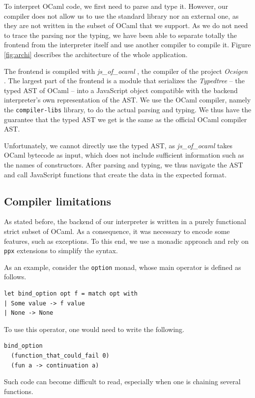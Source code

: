 \documentclass[twocolumn,a4paper]{article}
\begin{document}
To interpret OCaml code, we first need to parse and type it. However, our
compiler does not allow us to use the standard library nor an external one, as
they are not written in the subset of OCaml that we support. As we do not need
to trace the parsing nor the typing, we have been able to separate totally the
frontend from the interpreter itself and use another compiler to compile it.
Figure \ref{fig:archi} describes the architecture of the whole application.

The frontend is compiled with \emph{js\_of\_ocaml}
\cite{DBLP:journals/spe/VouillonB14}, the compiler of the project \emph{Ocsigen}
\cite{balat:hal-00691710}. The largest part of the frontend is a module that
serializes the \emph{Typedtree} -- the typed AST of OCaml -- into a JavaScript
object compatible with the backend interpreter's own representation of the AST.
We use the OCaml compiler, namely the \texttt{compiler-libs} library, to do the
actual parsing and typing. We thus have the guarantee that the typed AST we get
is the same as the official OCaml compiler AST.

Unfortunately, we cannot directly use the typed AST, as \emph{js\_of\_ocaml}
takes OCaml bytecode as input, which does not include sufficient information
such as the names of constructors. After parsing and typing, we thus navigate
the AST and call JavaScript functions that create the data in the expected format.

\subsection{Compiler limitations}

As stated before, the backend of our interpreter is written in a purely
functional strict subset of OCaml. As a consequence, it was necessary to encode
some features, such as exceptions. To this end, we use a monadic approach and
rely on \texttt{ppx} extensions to simplify the syntax.

As an example, consider the \texttt{option} monad, whose main operator is
defined as follows.

\begin{verbatim}
let bind_option opt f = match opt with
| Some value -> f value
| None -> None
\end{verbatim}

To use this operator, one would need to write the following.
\begin{verbatim}
bind_option
  (function_that_could_fail 0)
  (fun a -> continuation a)
\end{verbatim}
Such code can become difficult to read, especially when one is chaining several
functions.
\end{document}
